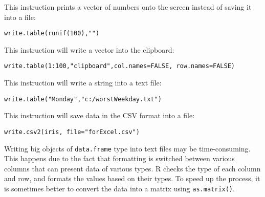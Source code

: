 \documentclass[]{book}
\theoremstyle{definition}
\theoremstyle{definition}
\theoremstyle{definition}
\theoremstyle{remark}
\begin{document}
This instruction prints a vector of numbers onto the screen instead of
saving it into a file:

\begin{verbatim}
write.table(runif(100),"")
\end{verbatim}

This instruction will write a vector into the clipboard:

\begin{verbatim}
write.table(1:100,"clipboard",col.names=FALSE, row.names=FALSE)
\end{verbatim}

This instruction will write a string into a text file:

\begin{verbatim}
write.table("Monday","c:/worstWeekday.txt")
\end{verbatim}

This instruction will save data in the CSV format into a file:

\begin{verbatim}
write.csv2(iris, file="forExcel.csv")
\end{verbatim}

Writing big objects of \texttt{data.frame} type into text files may be
time-consuming. This happens due to the fact that formatting is switched
between various columns that can present data of various types. R checks
the type of each column and row, and formats the values based on their
types. To speed up the process, it is sometimes better to convert the
data into a matrix using \texttt{as.matrix()}.
\end{document}
